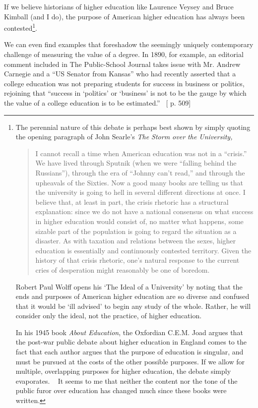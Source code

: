 If we believe historians of higher education like Laurence Veysey and Bruce Kimball (and I do), the purpose of American higher education has always been contested\footnote{The perennial nature of this debate is perhaps best shown by simply quoting the opening paragraph of John Searle's \emph{The Storm over the University,}

\begin{quote}

I cannot recall a time when American education was not in a ``crisis.'' We have lived through Sputnik (when we were ``falling behind the Russians''), through the era of ``Johnny can't read,'' and through the upheavals of the Sixties. Now a good many books are telling us that the university is going to hell in several different directions at once. I believe that, at least in part, the crisis rhetoric has a structural explanation: since we do not have a national consensus on what success in higher education would consist of, no matter what happens, some sizable part of the population is going to regard the situation as a disaster. As with taxation and relations between the sexes, higher education is essentially and continuously contested territory. Given the history of that crisis rhetoric, one's natural response to the current cries of desperation might reasonably be one of boredom.
\end{quote}

Robert Paul Wolff opens his `The Ideal of a University' by noting that the ends and purposes of American higher education are so diverse and confused that it would be `ill advised' to begin any study of the whole. Rather, he will consider only the ideal, not the practice, of higher education.~\citep[p. 1]{Wolff:1999va}

In his 1945 book \emph{About Education}, the Oxfordian C.E.M. Joad argues that the post-war public debate about higher education in England comes to the fact that each author argues that the purpose of education is singular, and must be pursued at the costs of the other possible purposes. If we allow for multiple, overlapping purposes for higher education, the debate simply evaporates. ~\citep[p. 23]{Joad:1945wm} It seems to me that neither the content nor the tone of the public furor over education has changed much since these books were written.}. 

We can even find examples that foreshadow the seemingly uniquely contemporary challenge of measuring the value of a degree. In 1890, for example, an editorial comment included in The Public-School Journal takes issue with Mr. Andrew Carnegie and a ``US Senator from Kansas'' who had recently asserted that a college education was not preparing students for success in business or politics, rejoining that ``success in `politics' or `business' is not to be the gauge by which the value of a college education is to be estimated.'' ~\citep{Anonymous:1890uw}[ p. 509] 

